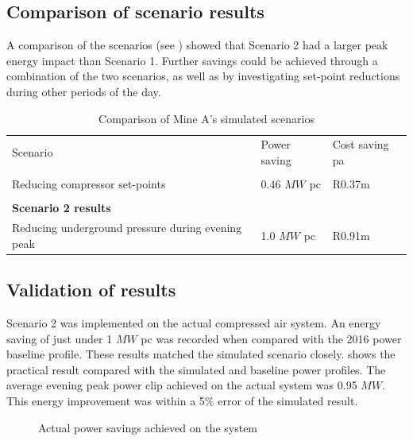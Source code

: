 \subsection{Comparison of scenario results}
A comparison of the scenarios (see ) showed that Scenario 2 had a larger peak energy impact than Scenario 1. Further savings could be achieved through a combination of the two scenarios, as well as by investigating  set-point reductions during other periods of the day.\\
\begin{table}[h!]
	\caption{Comparison of Mine A's simulated scenarios}
	\centering
	\begin{tabular}{p{}
			p{}
			p{}}
		\hline 
		Scenario & Power saving & Cost saving \gls{pa} \\
		\hhline{===} 
		\multicolumn{3}{l}{\textbf{Scenario 1 results}} \\
		Reducing compressor  set-points & $ 0.46 $ $MW$ \gls{pc} & R0.37m \\
		\\
		\multicolumn{3}{l}{\textbf{Scenario 2 results}} \\
		Reducing underground pressure during evening peak& 1.0 $MW$ \gls{pc} & R0.91m\\
		\hline
	\end{tabular}
	
	\label{Table: A Comparison}
\end{table}

\subsection{Validation of results}
Scenario 2 was implemented on the actual compressed air system. An energy saving of just under 1 $MW$ \gls{pc} was recorded when compared with the 2016 power baseline profile. These results matched the simulated scenario closely.  shows the practical result compared with the simulated and baseline power profiles. The average evening peak power clip achieved on the actual system was 0.95 $MW$. This energy improvement was within a 5\% error of the simulated result.
\begin{figure}[h!]
	\centering
	
	\caption{Actual power savings achieved on the system}
	\label{fig: Actual permormance beet}
\end{figure}
